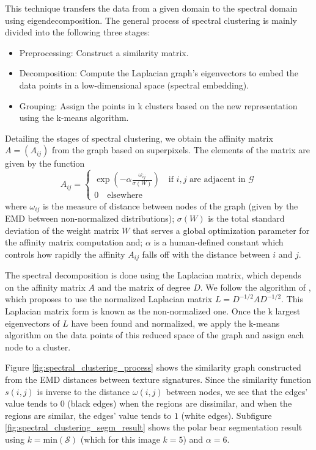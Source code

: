 This technique transfers the data from a given domain to the spectral domain using eigendecomposition. The general process of spectral clustering is mainly divided into the following three stages:

\begin{itemize}
	\item Preprocessing: Construct a similarity matrix.
	\item Decomposition: Compute the Laplacian graph's eigenvectors to embed the data points in a low-dimensional space (spectral embedding).
	\item Grouping: Assign the points in k clusters based on the new representation using the k-means algorithm.
\end{itemize}

Detailing the stages of spectral clustering, we obtain the affinity matrix $A = (A_{ij})$ from the graph based on superpixels. The elements of the matrix are given by the function
\begin{equation}	
	A_{ij}= 
	\begin{cases}
		\exp{\left(- \alpha \frac{\omega_{ij}}{\sigma(W)}\right)}  \quad \text{if $i, j$ are adjacent in $\mathcal{G}$} \\
		0 \quad \text{elsewhere}
	\end{cases}	 
\end{equation}
where $\omega_{ij}$ is the measure of distance between nodes of the graph (given by the EMD between non-normalized distributions); $\sigma(W)$ is the total standard deviation of the weight matrix $W$ that serves a global optimization parameter for the affinity matrix computation and; $\alpha$ is a human-defined constant which controls how rapidly the affinity $A_{ij}$ falls off with the distance between $i$ and $j$.

The spectral decomposition is done using the Laplacian matrix, which depends on the affinity matrix $A$ and the matrix of degree $D$. We follow the algorithm of \cite{Ng.Jordan.ea:NIPS:2001}, which proposes to use the normalized Laplacian matrix $L = D^{-1/2} A D^{-1/2}$. This Laplacian matrix form is known as the non-normalized one. Once the k largest eigenvectors of $ L $ have been found and normalized, we apply the k-means algorithm on the data points of this reduced space of the graph and assign each node to a cluster.

Figure \ref{fig:spectral_clustering_process} shows the similarity graph constructed from the EMD distances between texture signatures. Since the similarity function $s(i, j)$ is inverse to the distance $\omega (i, j)$ between nodes, we see that the edges' value tends to $0$ (black edges) when the regions are dissimilar, and when the regions are similar, the edges' value tends to $1$ (white edges). Subfigure \ref{fig:spectral_clustering_segm_result} shows the polar bear segmentation result using $k = \mathrm{min}(\mathcal{S})$ (which for this image $k =5$) and $\alpha = 6$.

